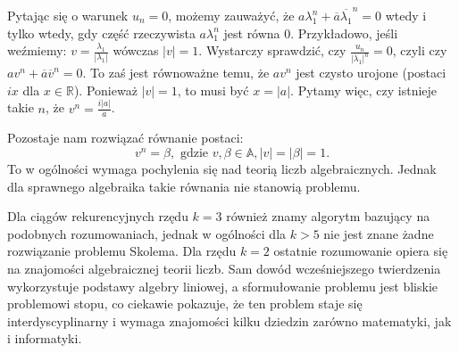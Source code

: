 \documentclass[leqno,10pt]{article}
\def\A{\mathbb{A}}
\begin{document}
Pytając się o warunek $u_n = 0$, możemy zauważyć, że $a \lambda_1^{n} + \overline{a} \overline{\lambda_1}^{n} = 0 $ wtedy i tylko wtedy, gdy część rzeczywista $a {\lambda_1^{n}}$ jest równa $0$. 
Przykładowo, jeśli weźmiemy: $v = \frac{\lambda_1}{|\lambda_1|} $ wówczas $|v| = 1$.
Wystarczy sprawdzić, czy $\frac{u_n}{|\lambda_1|^n} = 0$, czyli czy $a v^{n} + \overline{a} \overline{v} ^{n} = 0$.
To zaś jest równoważne temu, że $a v^{n}$ jest czysto urojone (postaci $ix$ dla $x \in \mathbb{R}$). Ponieważ $|v| = 1$, to musi być $x = |a|$. Pytamy więc, czy istnieje takie $n$, że $v^{n} = \frac{i |a|}{a}$.

Pozostaje nam rozwiązać równanie postaci:
\begin{equation*}
    v^{n} = \beta, \text{ gdzie } v, \beta \in \A, |v| = |\beta| = 1.
\end{equation*}
To w ogólności wymaga pochylenia się nad teorią liczb algebraicznych. Jednak dla sprawnego algebraika takie równania nie stanowią problemu. 

Dla ciągów rekurencyjnych rzędu $k=3$ również znamy algorytm bazujący na podobnych rozumowaniach, jednak w ogólności dla $k>5$ nie jest znane żadne rozwiązanie problemu Skolema. Dla rzędu $k=2$ ostatnie rozumowanie opiera się na znajomości algebraicznej teorii liczb. Sam dowód wcześniejszego twierdzenia wykorzystuje podstawy algebry liniowej, a sformułowanie problemu jest bliskie problemowi stopu, co ciekawie pokazuje, że ten problem staje się interdyscyplinarny i wymaga znajomości kilku dziedzin zarówno matematyki, jak i informatyki. 
\end{document}
